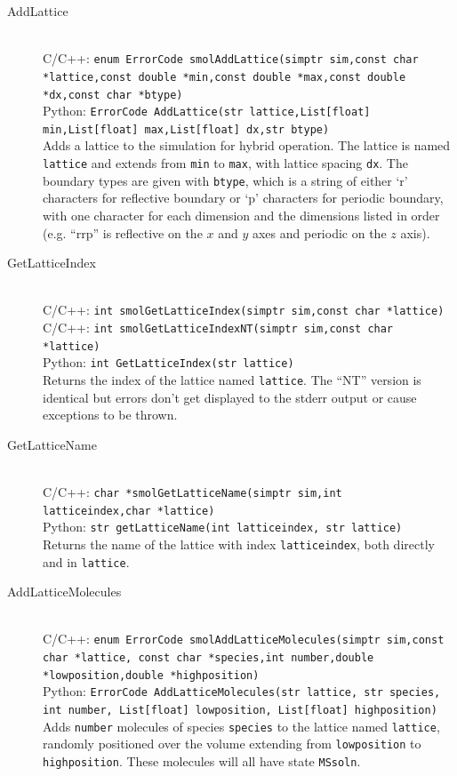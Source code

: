 \documentclass {book}
\newcommand {\ttt} {\texttt}
\begin{document}
\begin{description}

\item[AddLattice]
\hfill \\
C/C++: \ttt{enum ErrorCode smolAddLattice(simptr sim,const char *lattice,const double *min,const double *max,const double *dx,const char *btype)}\\
Python: \ttt{ErrorCode AddLattice(str lattice,List[float] min,List[float] max,List[float] dx,str btype)}\\
Adds a lattice to the simulation for hybrid operation. The lattice is named \ttt{lattice} and extends from \ttt{min} to \ttt{max}, with lattice spacing \ttt{dx}. The boundary types are given with \ttt{btype}, which is a string of either `r' characters for reflective boundary or `p' characters for periodic boundary, with one character for each dimension and the dimensions listed in order (e.g. ``rrp'' is reflective on the $x$ and $y$ axes and periodic on the $z$ axis).

\item[GetLatticeIndex]
\hfill \\
C/C++: \ttt{int smolGetLatticeIndex(simptr sim,const char *lattice)}\\
C/C++: \ttt{int smolGetLatticeIndexNT(simptr sim,const char *lattice)}\\
Python: \ttt{int GetLatticeIndex(str lattice)}\\
Returns the index of the lattice named \ttt{lattice}. The ``NT'' version is identical but errors don't get displayed to the stderr output or cause exceptions to be thrown.

\item[GetLatticeName]
\hfill \\
C/C++: \ttt{char *smolGetLatticeName(simptr sim,int latticeindex,char *lattice)}\\
Python: \ttt{str getLatticeName(int latticeindex, str lattice)}\\
Returns the name of the lattice with index \ttt{latticeindex}, both directly and in \ttt{lattice}.

\item[AddLatticeMolecules]
\hfill \\
C/C++: \ttt{enum ErrorCode smolAddLatticeMolecules(simptr sim,const char *lattice, const char *species,int number,double *lowposition,double *highposition)}\\
Python: \ttt{ErrorCode AddLatticeMolecules(str lattice, str species, int number, List[float] lowposition, List[float] highposition)}\\
Adds \ttt{number} molecules of species \ttt{species} to the lattice named \ttt{lattice}, randomly positioned over the volume extending from \ttt{lowposition} to \ttt{highposition}. These molecules will all have state \ttt{MSsoln}.


\end{description}
\end{document}
